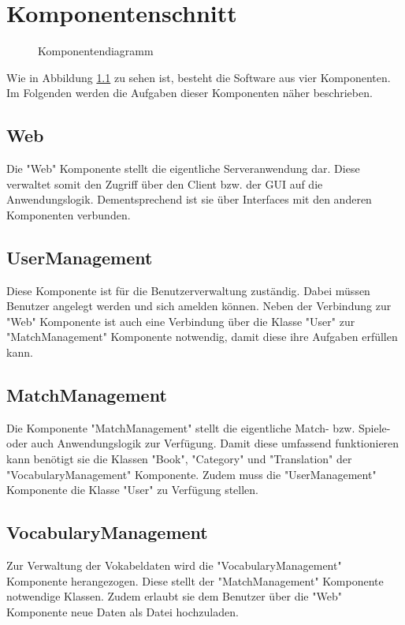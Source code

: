 \chapter{Komponentenschnitt}
\begin{figure}[H]
    \centering
    \caption{Komponentendiagramm}
    \label{komp}
\end{figure}
Wie in Abbildung \ref{komp} zu sehen ist, besteht die Software aus vier Komponenten. Im Folgenden werden die Aufgaben dieser Komponenten näher beschrieben.
\section*{Web}
Die "Web" Komponente stellt die eigentliche Serveranwendung dar. Diese verwaltet somit den Zugriff über den Client bzw. der GUI auf die Anwendungslogik. Dementsprechend ist sie über Interfaces mit den anderen Komponenten verbunden.
\section*{UserManagement}
Diese Komponente ist für die Benutzerverwaltung zuständig. Dabei müssen Benutzer angelegt werden und sich amelden können. Neben der Verbindung zur "Web" Komponente ist auch eine Verbindung über die Klasse "User" zur "MatchManagement" Komponente notwendig, damit diese ihre Aufgaben erfüllen kann.
\section*{MatchManagement}
Die Komponente "MatchManagement" stellt die eigentliche Match- bzw. Spiele- oder auch Anwendungslogik zur Verfügung. Damit diese umfassend funktionieren kann benötigt sie die Klassen "Book", "Category" und "Translation" der "VocabularyManagement" Komponente. Zudem muss die "UserManagement" Komponente die Klasse "User" zu Verfügung stellen.
\section*{VocabularyManagement}
Zur Verwaltung der Vokabeldaten wird die "VocabularyManagement" Komponente herangezogen. Diese stellt der "MatchManagement" Komponente notwendige Klassen. Zudem erlaubt sie dem Benutzer über die "Web" Komponente neue Daten als Datei hochzuladen.
\clearpage
